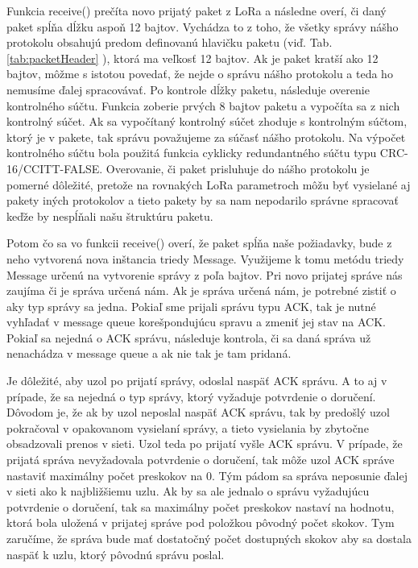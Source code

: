 \documentclass[slovak,master]{diploma}
\begin{document}
Funkcia receive() prečíta novo prijatý paket z LoRa a následne overí, či daný paket spĺňa dĺžku aspoň 12 bajtov. Vychádza to z toho, že všetky správy nášho protokolu obsahujú predom definovanú 
hlavičku paketu (viď. Tab. \ref{tab:packetHeader} ), ktorá ma veľkosť 12 bajtov. Ak je paket kratší ako 12 bajtov, môžme s istotou povedať, že nejde o správu nášho protokolu a teda ho nemusíme ďalej spracovávať. Po kontrole dĺžky paketu, následuje overenie 
kontrolného súčtu. Funkcia zoberie prvých 8 bajtov paketu a vypočíta sa z nich kontrolný súčet. Ak sa vypočítaný kontrolný súčet zhoduje s kontrolným súčtom, ktorý je v pakete, tak správu považujeme za 
súčasť nášho protokolu. Na výpočet kontrolného súčtu bola použitá funkcia cyklicky redundantného súčtu typu CRC-16/CCITT-FALSE. Overovanie, či paket prisluhuje do nášho protokolu je pomerné dôležité, 
pretože na rovnakých LoRa parametroch môžu byť vysielané aj pakety iných protokolov a tieto pakety by sa nam nepodarilo správne spracovať keďže by nespĺňali našu štruktúru paketu.

Potom čo sa vo funkcii receive() overí, že paket spĺňa naše požiadavky, bude z neho vytvorená nova inštancia triedy Message. Využijeme k tomu metódu triedy Message určenú na vytvorenie správy z 
poľa bajtov. Pri novo prijatej správe nás zaujíma či je správa určená nám. Ak je správa určená nám, je potrebné zistiť o aky typ správy sa jedna. Pokiaľ sme prijali správu typu ACK, tak je 
nutné vyhľadať v message queue korešpondujúcu spravu a zmeniť jej stav na ACK. Pokiaľ sa nejedná o ACK správu, následuje kontrola, či sa daná správa už nenachádza v message queue a ak nie tak je tam pridaná.

Je dôležité, aby uzol po prijatí správy, odoslal naspäť ACK správu. A to aj v prípade, že sa nejedná o typ správy, ktorý vyžaduje potvrdenie o doručení. Dôvodom je, že ak by 
uzol neposlal naspäť ACK správu, tak by predošlý uzol pokračoval v opakovanom vysielaní správy, a tieto vysielania by zbytočne obsadzovali prenos v sieti. Uzol teda po prijatí vyšle ACK správu. 
V prípade, že prijatá správa nevyžadovala potvrdenie o doručení, tak môže uzol ACK správe nastaviť maximálny počet preskokov na 0. 
Tým pádom sa správa neposunie ďalej v sieti ako k najbližšiemu uzlu. Ak by sa ale jednalo o správu vyžadujúcu potvrdenie o doručení, tak sa maximálny počet preskokov nastaví na 
hodnotu, ktorá bola uložená v prijatej správe pod položkou pôvodný počet skokov. 
Tym zaručíme, že správa bude mať dostatočný počet dostupných skokov aby sa dostala naspäť k uzlu, ktorý pôvodnú správu poslal.
\end{document}
